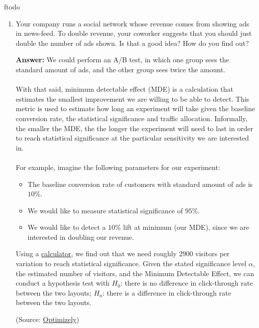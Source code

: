 ƒtodo\documentclass{article}
\newenvironment{QandA}{\begin{enumerate}[label=\arabic*.]}{\end{enumerate}}
\newenvironment{answer}{\par\normalfont \textbf{Answer:}}{}
\begin{document}
\begin{QandA}
    \item Your company runs a social network whose revenue comes from showing ads in news-feed. To double revenue, your coworker suggests that you should just double the number of ads shown. Is that a good idea? How do you find out?
    \begin{answer}
        We could perform an A/B test, in which one group sees the standard amount of ads, and the other group sees twice the amount. \\\\
        With that said, minimum detectable effect (MDE) is a calculation that estimates the smallest improvement we are willing to be able to detect.
        This metric is used to estimate how long an experiment will take given the baseline conversion rate, the statistical significance and traffic allocation. Informally, the smaller the MDE, the the longer the experiment will need to last in order to reach statistical significance at the particular sensitivity we are interested in.\\\\
        For example, imagine the following parameters for our experiment:
        \begin{itemize}
            \item The baseline conversion rate of customers with standard amount of ads is $10\%$.
            \item We would like to measure statistical significance of $95\%$.
            \item We would like to detect a $10\%$ lift at minimum (our MDE), since we are interested in doubling our revenue. 
        \end{itemize}
        Using a \href{https://www.optimizely.com/sample-size-calculator/?conversion=10&effect=20&significance=95}{calculator}, we find out that we need roughly $2900$ visitors per variation to reach statistical significance. Given the stated significance level $\alpha$, the estimated number of visitors, and the Minimum Detectable Effect, we can conduct a hypothesis test with $H_0$: there is no difference in click-through rate between the two layouts; $H_a$: there is a difference in click-through rate between the two layouts. 

        (Source: \href{https://support.optimizely.com/hc/en-us/articles/4410288881293-Use-minimum-detectable-effect-MDE-when-designing-an-experiment}{Optimizely})
    \end{answer}


\end{QandA}
\end{document}
